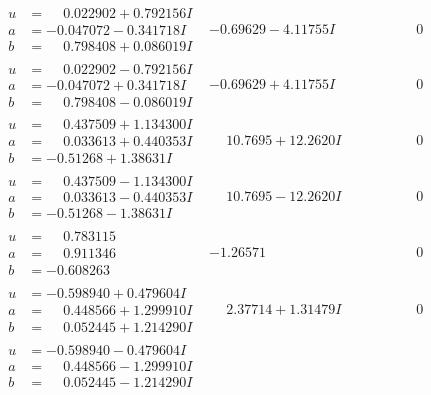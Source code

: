 \documentclass[1p]{elsarticle_modified}
\theoremstyle{definition}
\begin{document}
$$\begin{array}{c|c|c}
\begin{aligned}
u &= \phantom{-}0.022902 + 0.792156 I \\
a &= -0.047072 - 0.341718 I \\
b &= \phantom{-}0.798408 + 0.086019 I\end{aligned}
 & -0.69629 - 4.11755 I & \phantom{-0.000000 } 0 \\ \hline\begin{aligned}
u &= \phantom{-}0.022902 - 0.792156 I \\
a &= -0.047072 + 0.341718 I \\
b &= \phantom{-}0.798408 - 0.086019 I\end{aligned}
 & -0.69629 + 4.11755 I & \phantom{-0.000000 } 0 \\ \hline\begin{aligned}
u &= \phantom{-}0.437509 + 1.134300 I \\
a &= \phantom{-}0.033613 + 0.440353 I \\
b &= -0.51268 + 1.38631 I\end{aligned}
 & \phantom{-}10.7695 + 12.2620 I & \phantom{-0.000000 } 0 \\ \hline\begin{aligned}
u &= \phantom{-}0.437509 - 1.134300 I \\
a &= \phantom{-}0.033613 - 0.440353 I \\
b &= -0.51268 - 1.38631 I\end{aligned}
 & \phantom{-}10.7695 - 12.2620 I & \phantom{-0.000000 } 0 \\ \hline\begin{aligned}
u &= \phantom{-}0.783115\phantom{ +0.000000I} \\
a &= \phantom{-}0.911346\phantom{ +0.000000I} \\
b &= -0.608263\phantom{ +0.000000I}\end{aligned}
 & -1.26571\phantom{ +0.000000I} & \phantom{-0.000000 } 0 \\ \hline\begin{aligned}
u &= -0.598940 + 0.479604 I \\
a &= \phantom{-}0.448566 + 1.299910 I \\
b &= \phantom{-}0.052445 + 1.214290 I\end{aligned}
 & \phantom{-}2.37714 + 1.31479 I & \phantom{-0.000000 } 0 \\ \hline\begin{aligned}
u &= -0.598940 - 0.479604 I \\
a &= \phantom{-}0.448566 - 1.299910 I \\
b &= \phantom{-}0.052445 - 1.214290 I\end{aligned}

\end{array}$$
\end{document}
